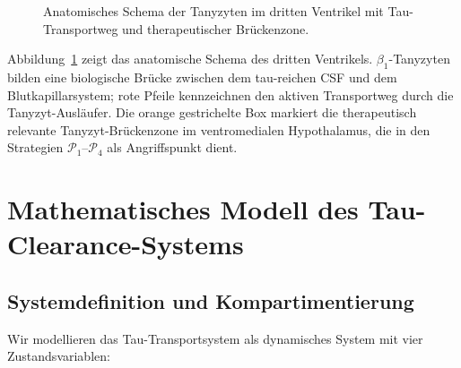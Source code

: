 ﻿\documentclass[12pt,a4paper]{article}
\theoremstyle{definition}
\begin{document}
\begin{figure}[H]
		\caption{Anatomisches Schema der Tanyzyten im dritten Ventrikel mit Tau-Transportweg und therapeutischer Brückenzone.}
		\label{fig:tanyzyt_anatomie}
	\end{figure}
	{\small Abbildung~\ref{fig:tanyzyt_anatomie} zeigt das anatomische Schema des dritten Ventrikels. $\beta_1$-Tanyzyten bilden eine biologische Brücke zwischen dem tau-reichen CSF und dem Blutkapillarsystem; rote Pfeile kennzeichnen den aktiven Transportweg durch die Tanyzyt-Ausläufer. Die orange gestrichelte Box markiert die therapeutisch relevante Tanyzyt-Brückenzone im ventromedialen Hypothalamus, die in den Strategien $\mathcal{P}_1$--$\mathcal{P}_4$ als Angriffspunkt dient.}
	
	\section{Mathematisches Modell des Tau-Clearance-Systems}
	
	\subsection{Systemdefinition und Kompartimentierung}
	
	Wir modellieren das Tau-Transportsystem als dynamisches System mit vier Zustandsvariablen:
	
\end{document}
